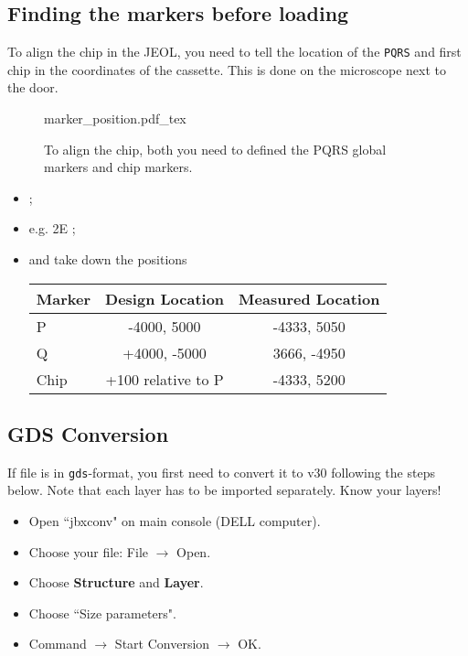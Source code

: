 \subsection{Finding the markers before loading}
\label{sec:marker_location}

To align the chip in the JEOL,  you need to tell  the location of
the \texttt{PQRS}  and first chip in  the coordinates of the  cassette.  This is
done on the microscope next to the door.

\begin{figure}[h]
  \centering
  \def\svgwidth{8cm}{marker_position.pdf_tex}
  \caption{\small To  align the chip, both  you need to defined  the PQRS global
    markers and chip markers.\label{fig:marker_position}}
\end{figure}

\begin{framed}\noindent
\end{framed}

\begin{itemize}
\item {};
\item {} e.g.  2E \ira {};
\item {} and take  down the positions
  \ira {}

  \begin{table}[htbp]
    \centering
    \begin{tabular}{|l|c|c|}
      \hline
      \textbf{Marker} & \textbf{Design Location} & \textbf{Measured Location}\\\hline
      P & -4000, 5000 & -4333, 5050\\
      Q & +4000, -5000 & 3666, -4950\\
      Chip & +100 relative to P & -4333, 5200 \\\hline
    \end{tabular}
  \end{table}
\end{itemize}

\subsection{GDS Conversion}
If file is in \texttt{gds}-format, you first need to convert it to v30 following
the steps below.  Note that each layer  has to be imported separately. Know your
layers!
\begin{itemize}
\item Open ``jbxconv" on main console (DELL computer).
\item Choose your file: File $\rightarrow$ Open.
\item Choose \textbf{Structure} and \textbf{Layer}.
\item Choose ``Size parameters".
\item Command $\rightarrow$ Start Conversion $\rightarrow$ OK.
\end{itemize}

